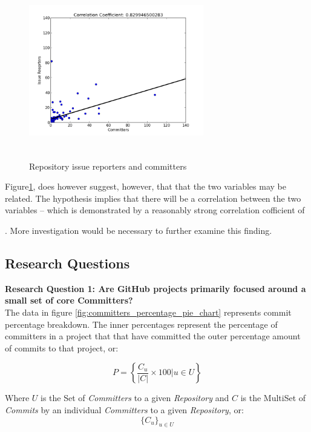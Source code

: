 \documentclass{proc}
\begin{document}
{{{{{{\begin{figure}
\includegraphics[height=3in,width=3in]{images/issue_reporters_committers_scatterplot.png}
\caption{Repository issue reporters and committers}
\label{fig:issue_reporters_committers_scatterplot}
\end{figure}

Figure\ref{fig:issue_reporters_committers_scatterplot}, does however suggest, however, that that the two variables may be related. The hypothesis implies that there will be a correlation between the two variables -- which is demonstrated by a reasonably strong correlation cofficient of }\unskip. More investigation would be necessary to further examine this finding.\\

\subsection{Research Questions}
\noindent \textbf{Research Question 1: Are GitHub projects primarily focused around a small set of core Committers?}\\
The data in figure \ref{fig:committers_percentage_pie_chart} represents commit percentage breakdown. The inner percentages represent the percentage of committers in a project that that have committed the outer percentage amount of commits to that project, or:

\begin{equation}
P = \left\{ \frac{ C_u } { |C| } \times 100 \Big| u \in U \right\}
\label{eq:commit_percentage}
\end{equation}

Where $U$ is the Set of \textit{Committers} to a given \textit{Repository} and $C$ is the MultiSet of \textit{Commits} by an individual \textit{Committers} to a given \textit{Repository}, or:
 \[ \{ C_u \}_{u \in U} \]

}}}}}
\end{document}
